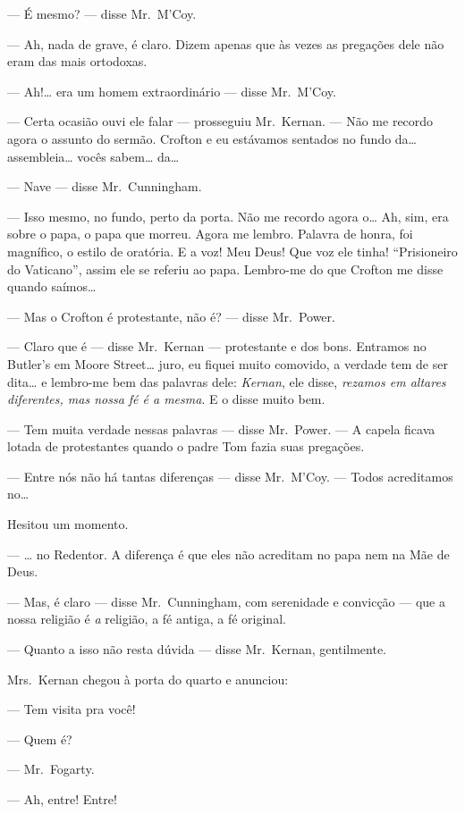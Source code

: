 --- É mesmo? --- disse Mr.~M’Coy.

--- Ah, nada de grave, é claro.  Dizem apenas que às vezes as pregações dele
não eram das mais ortodoxas.

--- Ah!\ldots{} era um homem extraordinário --- disse Mr.~M’Coy.

--- Certa ocasião ouvi ele falar --- prosseguiu Mr.~Kernan.  --- Não me recordo
agora o assunto do sermão.  Crofton e eu estávamos sentados no fundo da\ldots{}
assembleia\ldots{} vocês sabem\ldots{} da\ldots{}

--- Nave --- disse Mr.~Cunningham.

--- Isso mesmo, no fundo, perto da porta.  Não me recordo agora o\ldots{} Ah,
sim, era sobre o papa, o papa que morreu.  Agora me lembro.  Palavra de honra,
foi magnífico, o estilo de oratória.  E a voz!  Meu Deus!  Que voz ele tinha!
“Prisioneiro do Vaticano”, assim ele se referiu ao papa.  Lembro-me do que
Crofton me disse quando saímos\ldots{}

--- Mas o Crofton é protestante, não é? --- disse Mr.~Power.

--- Claro que é --- disse Mr.~Kernan --- protestante e dos bons.  Entramos no
Butler’s em Moore Street\ldots{} juro, eu fiquei muito comovido, a verdade tem
de ser dita\ldots{} e lembro-me bem das palavras dele: \textit{Kernan}, ele
disse, \textit{rezamos em altares diferentes, mas nossa fé é a mesma}.
E o disse muito bem.

--- Tem muita verdade nessas palavras --- disse Mr.~Power.  --- A capela ficava
lotada de protestantes quando o padre Tom fazia suas pregações.

--- Entre nós não há tantas diferenças --- disse Mr.~M’Coy.  --- Todos
acreditamos no\ldots{}

Hesitou um momento.

--- \ldots{} no Redentor.  A diferença é que eles não acreditam no papa nem na
Mãe de Deus.

--- Mas, é claro --- disse Mr.~Cunningham, com serenidade e convicção --- que a
nossa religião é \textit{a} religião, a fé antiga, a fé original.

--- Quanto a isso não resta dúvida --- disse Mr.~Kernan, gentilmente.

Mrs.~Kernan chegou à porta do quarto e anunciou:

--- Tem visita pra você!

--- Quem é?

--- Mr.~Fogarty.

--- Ah, entre!  Entre!


